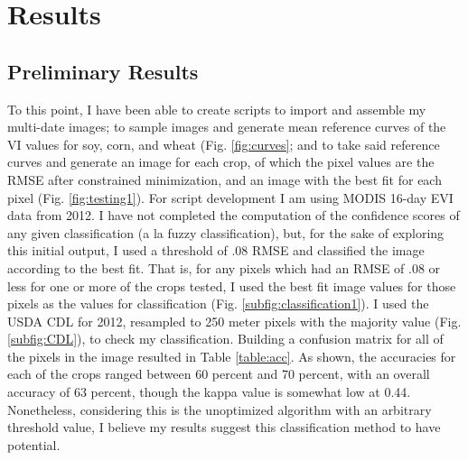 \chapter{Results}
\section{Preliminary Results}
\label{sec:prelim}

To this point, I have been able to create scripts to import and assemble my multi-date images; to sample images and generate mean reference curves of the VI values for soy, corn, and wheat (Fig. \ref{fig:curves}; and to take said reference curves and generate an image for each crop, of which the pixel values are the RMSE after constrained minimization, and an image with the best fit for each pixel (Fig. \ref{fig:testing1}). For script development I am using MODIS 16-day EVI data from 2012. I have not completed the computation of the confidence scores of any given classification (a la fuzzy classification), but, for the sake of exploring this initial output, I used a threshold of .08 RMSE and classified the image according to the best fit. That is, for any pixels which had an RMSE of .08 or less for one or more of the crops tested, I used the best fit image values for those pixels as the values for classification (Fig. \ref{subfig:classification1}). I used the USDA CDL for 2012, resampled to 250 meter pixels with the majority value (Fig. \ref{subfig:CDL}), to check my classification. Building a confusion matrix for all of the pixels in the image resulted in Table \ref{table:acc}. As shown, the accuracies for each of the crops ranged between 60 percent and 70 percent, with an overall accuracy of 63 percent, though the kappa value is somewhat low at 0.44. Nonetheless, considering this is the unoptimized algorithm with an arbitrary threshold value, I believe my results suggest this classification method to have potential.

